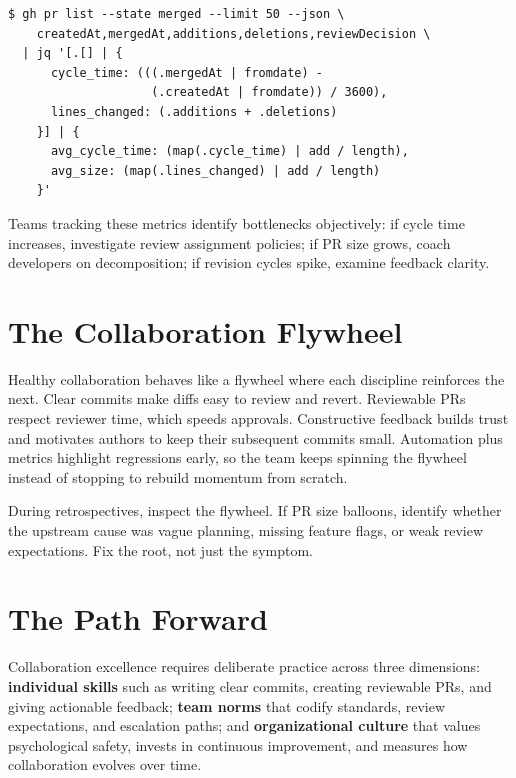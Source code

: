 \begin{lstlisting}[style=shell,caption={Measuring PR metrics with GitHub CLI}]
$ gh pr list --state merged --limit 50 --json \
    createdAt,mergedAt,additions,deletions,reviewDecision \
  | jq '[.[] | {
      cycle_time: (((.mergedAt | fromdate) -
                    (.createdAt | fromdate)) / 3600),
      lines_changed: (.additions + .deletions)
    }] | {
      avg_cycle_time: (map(.cycle_time) | add / length),
      avg_size: (map(.lines_changed) | add / length)
    }'
\end{lstlisting}

Teams tracking these metrics identify bottlenecks objectively: if cycle time increases, investigate review assignment policies; if PR size grows, coach developers on decomposition; if revision cycles spike, examine feedback clarity.

\section{The Collaboration Flywheel}
Healthy collaboration behaves like a flywheel where each discipline reinforces the next. Clear commits make diffs easy to review and revert. Reviewable PRs respect reviewer time, which speeds approvals. Constructive feedback builds trust and motivates authors to keep their subsequent commits small. Automation plus metrics highlight regressions early, so the team keeps spinning the flywheel instead of stopping to rebuild momentum from scratch.

\begin{tipbox}
During retrospectives, inspect the flywheel. If PR size balloons, identify whether the upstream cause was vague planning, missing feature flags, or weak review expectations. Fix the root, not just the symptom.
\end{tipbox}

\section{The Path Forward}

Collaboration excellence requires deliberate practice across three dimensions: \textbf{individual skills} such as writing clear commits, creating reviewable PRs, and giving actionable feedback; \textbf{team norms} that codify standards, review expectations, and escalation paths; and \textbf{organizational culture} that values psychological safety, invests in continuous improvement, and measures how collaboration evolves over time.

